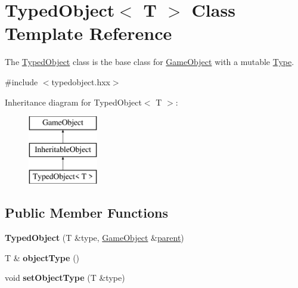 \hypertarget{class_typed_object}{\section{\-Typed\-Object$<$ \-T $>$ \-Class \-Template \-Reference}
\label{class_typed_object}
}


\-The \hyperlink{class_typed_object}{\-Typed\-Object} class is the base class for \hyperlink{class_game_object}{\-Game\-Object} with a mutable \hyperlink{class_type}{\-Type}.  




{\ttfamily \#include $<$typedobject.\-hxx$>$}

\-Inheritance diagram for \-Typed\-Object$<$ \-T $>$\-:\begin{figure}[H]
\begin{center}
\leavevmode
\includegraphics[height=3.000000cm]{class_typed_object}
\end{center}
\end{figure}
\subsection*{\-Public \-Member \-Functions}
\begin{DoxyCompactItemize}
\item 
\hypertarget{class_typed_object_a10319b334d59e8c51a05f56b37001381}{{\bfseries \-Typed\-Object} (\-T \&type, \hyperlink{class_game_object}{\-Game\-Object} \&\hyperlink{class_game_object_af3deaf39cde23c189765634e32e95bb4}{parent})}\label{class_typed_object_a10319b334d59e8c51a05f56b37001381}

\item 
\hypertarget{class_typed_object_af7e793c302dad222271aaad3f800b81d}{\-T \& {\bfseries object\-Type} ()}\label{class_typed_object_af7e793c302dad222271aaad3f800b81d}

\item 
\hypertarget{class_typed_object_a0ece67a4e69c1cb1c127e2316236f8a3}{void {\bfseries set\-Object\-Type} (\-T \&type)}\label{class_typed_object_a0ece67a4e69c1cb1c127e2316236f8a3}

\end{DoxyCompactItemize}
